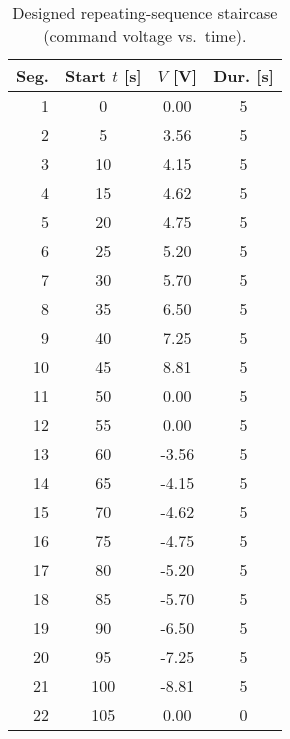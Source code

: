 \begin{table}[t]
\centering
\caption{Designed repeating-sequence staircase (command voltage vs.\ time).}
\label{tab:stair_design}
\begin{tabular}{@{}rS[table-format=3.0]S[table-format=1.2]S[table-format=3.0]@{}}
\toprule
Seg. & {Start $t$ [s]} & {$V$ [V]} & {Dur. [s]} \\
 & 0 & 0.00 & 5 \\
2 & 5 & 3.56 & 5 \\
3 & 10 & 4.15 & 5 \\
4 & 15 & 4.62 & 5 \\
5 & 20 & 4.75 & 5 \\
6 & 25 & 5.20 & 5 \\
7 & 30 & 5.70 & 5 \\
8 & 35 & 6.50 & 5 \\
9 & 40 & 7.25 & 5 \\
10 & 45 & 8.81 & 5 \\
11 & 50 & 0.00 & 5 \\
12 & 55 & 0.00 & 5 \\
13 & 60 & -3.56 & 5 \\
14 & 65 & -4.15 & 5 \\
15 & 70 & -4.62 & 5 \\
16 & 75 & -4.75 & 5 \\
17 & 80 & -5.20 & 5 \\
18 & 85 & -5.70 & 5 \\
19 & 90 & -6.50 & 5 \\
20 & 95 & -7.25 & 5 \\
21 & 100 & -8.81 & 5 \\
22 & 105 & 0.00 & 0 \\
\bottomrule
\end{tabular}
\end{table}